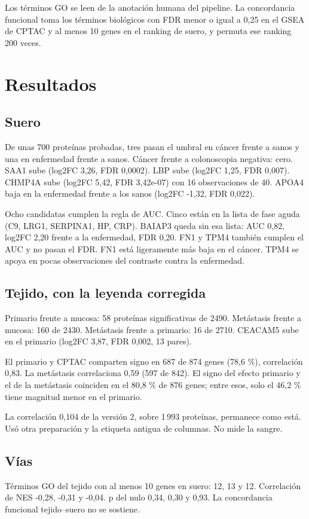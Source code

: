 \documentclass[11pt]{article}
\begin{document}
Los términos GO se leen de la anotación humana del pipeline. La concordancia funcional toma los términos biológicos con FDR menor o igual a 0,25 en el GSEA de CPTAC y al menos 10 genes en el ranking de suero, y permuta ese ranking 200 veces.

\section{Resultados}
\subsection{Suero}
De unas 700 proteínas probadas, tres pasan el umbral en cáncer frente a sanos y una en enfermedad frente a sanos. Cáncer frente a colonoscopia negativa: cero. SAA1 sube (log2FC 3,26, FDR 0,0002). LBP sube (log2FC 1,25, FDR 0,007). CHMP4A sube (log2FC 5,42, FDR 3,42e-07) con 16 observaciones de 40. APOA4 baja en la enfermedad frente a los sanos (log2FC -1,32, FDR 0,022).

Ocho candidatas cumplen la regla de AUC. Cinco están en la lista de fase aguda (C9, LRG1, SERPINA1, HP, CRP). BAIAP3 queda sin esa lista: AUC 0,82, log2FC 2,20 frente a la enfermedad, FDR 0,20. FN1 y TPM4 también cumplen el AUC y no pasan el FDR. FN1 está ligeramente más baja en el cáncer. TPM4 se apoya en pocas observaciones del contraste contra la enfermedad.

\subsection{Tejido, con la leyenda corregida}
Primario frente a mucosa: 58 proteínas significativas de 2490. Metástasis frente a mucosa: 160 de 2430. Metástasis frente a primario: 16 de 2710. CEACAM5 sube en el primario (log2FC 3,87, FDR 0,002, 13 pares).

El primario y CPTAC comparten signo en 687 de 874 genes (78,6 \%), correlación 0,83. La metástasis correlaciona 0,59 (597 de 842). El signo del efecto primario y el de la metástasis coinciden en el 80,8 \% de 876 genes; entre esos, solo el 46,2 \% tiene magnitud menor en el primario.

La correlación 0,104 de la versión 2, sobre 1\,993 proteínas, permanece como está. Usó otra preparación y la etiqueta antigua de columnas. No mide la sangre.

\subsection{Vías}
Términos GO del tejido con al menos 10 genes en suero: 12, 13 y 12. Correlación de NES -0,28, -0,31 y -0,04. p del nulo 0,34, 0,30 y 0,93. La concordancia funcional tejido--suero no se sostiene.
\end{document}
